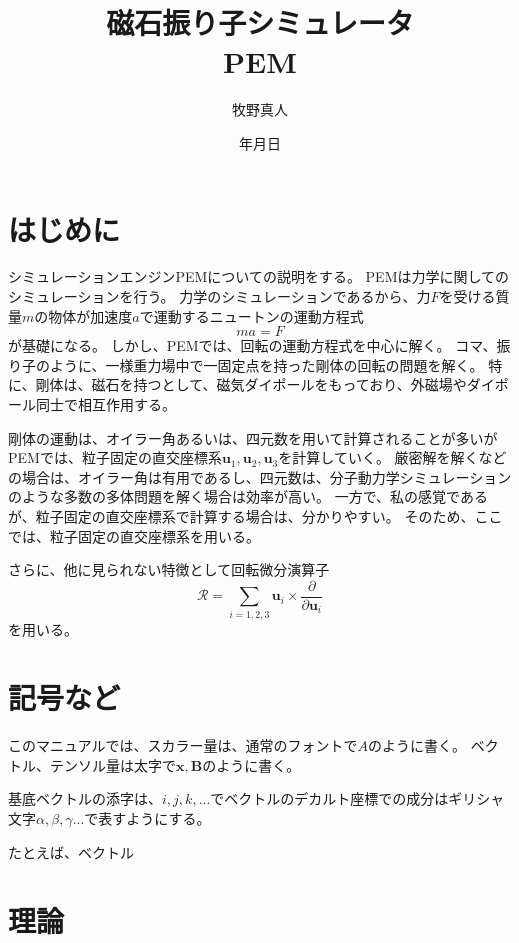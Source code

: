 \documentclass[a4paper,11pt]{jbook}
\title{磁石振り子シミュレータ\\PEM}
\author{牧野真人}
\date{\number\year 年\number\month 月\number\day 日}
\def\vecR {\bm {\mathcal {R} } }
\begin{document}
\maketitle
\tableofcontents 
\chapter{はじめに}
シミュレーションエンジンPEMについての説明をする。
PEMは力学に関してのシミュレーションを行う。
力学のシミュレーションであるから、力$F$を受ける質量$m$の物体が加速度$a$で運動するニュートンの運動方程式
\begin{equation}
ma=F
\end{equation}
が基礎になる。
しかし、PEMでは、回転の運動方程式を中心に解く。
コマ、振り子のように、一様重力場中で一固定点を持った剛体の回転の問題を解く。
特に、剛体は、磁石を持つとして、磁気ダイポールをもっており、外磁場やダイポール同士で相互作用する。

剛体の運動は、オイラー角あるいは、四元数を用いて計算されることが多いがPEMでは、粒子固定の直交座標系$\bm{u}_1,\bm{u}_2,\bm{u}_3$を計算していく。
厳密解を解くなどの場合は、オイラー角は有用であるし、四元数は、分子動力学シミュレーションのような多数の多体問題を解く場合は効率が高い。
一方で、私の感覚であるが、粒子固定の直交座標系で計算する場合は、分かりやすい。
そのため、ここでは、粒子固定の直交座標系を用いる。

さらに、他に見られない特徴として回転微分演算子
\begin{equation}
\vecR =\sum_{i=1,2,3}\bm{u}_i\times\frac{\partial}{\partial \bm{u}_i}
\end{equation}
を用いる。
\chapter{記号など}
このマニュアルでは、スカラー量は、通常のフォントで$A$のように書く。
ベクトル、テンソル量は太字で$\bm{x},\bm{B}$のように書く。

基底ベクトルの添字は、$i,j,k,...$でベクトルのデカルト座標での成分はギリシャ文字$\alpha, \beta,\gamma ...$で表すようにする。

たとえば、ベクトル
\chapter{理論}
\end{document}
